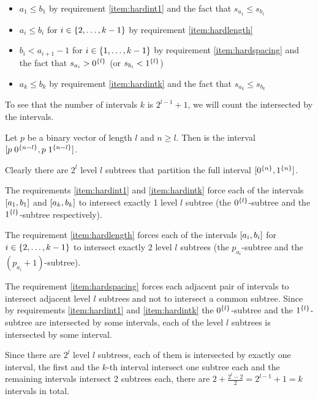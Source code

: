 \begin{itemize}
\item $a_1 \leq b_1$ by requirement \ref{item:hardint1}
and the fact that $s_{a_1} \leq s_{b_1}$
\item $a_i \leq b_i$
for $i \in \{2, \ldots, k-1\}$
by requirement \ref{item:hardlength}
\item $b_i < a_{i+1} - 1$
for $i \in \{1, \ldots, k-1\}$
by requirement \ref{item:hardspacing}
and the fact that $s_{a_i} > 0^{\{l\}}$
(or $s_{b_i} < 1^{\{l\}}$)
\item $a_k \leq b_k$ by requirement \ref{item:hardintk}
and the fact that $s_{a_k} \leq s_{b_k}$
\end{itemize}

To see that the number of intervals $k$ is $2^{l-1} + 1$,
we will count the 
intersected by the intervals.

\begin{definition}[Subtree]
Let $p$ be a binary vector of length $l$
and $n \geq l$.
Then  is the interval
$[p \; 0^{\{n-l\}}, p \; 1^{\{n-l\}}]$.
\end{definition}

Clearly there are $2^l$ level $l$ subtrees
that partition the full interval
$[0^{\{n\}}, 1^{\{n\}}]$.

The requirements
\ref{item:hardint1} and \ref{item:hardintk}
force each of the intervals
$[a_1, b_1]$ and $[a_k, b_k]$
to intersect exactly 1 level $l$ subtree
(the $0^{\{l\}}$-subtree
and the $1^{\{l\}}$-subtree respectively).

The requirement \ref{item:hardlength}
forces each of the intervals
$[a_i, b_i]$ for $i \in \{2, \ldots, k-1\}$
to intersect exactly 2 level $l$ subtrees
(the $p_{a_i}$-subtree and the $(p_{a_i}+1)$-subtree).

The requirement \ref{item:hardspacing}
forces each adjacent pair of intervals
to intersect adjacent level $l$ subtrees
and not to intersect a common subtree.
Since by requirements
\ref{item:hardint1} and \ref{item:hardintk}
the $0^{\{l\}}$-subtree
and the $1^{\{l\}}$-subtree
are intersected by some intervals,
each of the level $l$ subtrees is intersected
by some interval.

Since there are $2^l$ level $l$ subtrees,
each of them is intersected by exactly one interval,
the first and the $k$-th interval intersect
one subtree each
and the remaining intervals intersect 2 subtrees each,
there are $2 + \frac{2^l - 2}{2} = 2^{l-1} + 1 = k$
intervals in total.

